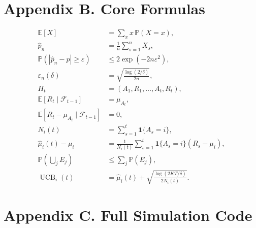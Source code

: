 \documentclass[en,nofont,11pt]{elegantbook}
\newcommand{\E}{\mathbb{E}}
\newcommand{\Pp}{\mathbb{P}}
\newcommand{\F}{\mathcal{F}}
\newcommand{\one}{\mathbf{1}}
\begin{document}
\chapter*{Appendix B. Core Formulas}

\begin{align}
\E[X] &= \sum_x x\,\Pp(X=x),\\
\widehat p_n &= \frac{1}{n}\sum_{s=1}^n X_s,\\
\Pp\left(|\widehat p_n-p|\geq \varepsilon\right) &\leq 2\exp(-2n\varepsilon^2),\\
\varepsilon_n(\delta) &= \sqrt{\frac{\log(2/\delta)}{2n}},\\
H_t &= (A_1,R_1,\ldots,A_t,R_t),\\
\E[R_t\mid \F_{t-1}] &= \mu_{A_t},\\
\E[R_t-\mu_{A_t}\mid \F_{t-1}] &=0,\\
N_i(t)&=\sum_{s=1}^t \one\{A_s=i\},\\
\widehat\mu_i(t)-\mu_i
&=\frac{1}{N_i(t)}\sum_{s=1}^t \one\{A_s=i\}(R_s-\mu_i),\\
\Pp\left(\bigcup_j E_j\right)&\leq \sum_j \Pp(E_j),\\
\operatorname{UCB}_i(t)&=\widehat\mu_i(t)+\sqrt{\frac{\log(2KT/\delta)}{2N_i(t)}}.
\end{align}

\chapter*{Appendix C. Full Simulation Code}



\backmatter
\nocite{lattimore2020bandit,bubeck2012,auer2002,howard2020timeuniform}
\printbibliography[heading=bibintoc,title={References}]
\end{document}
